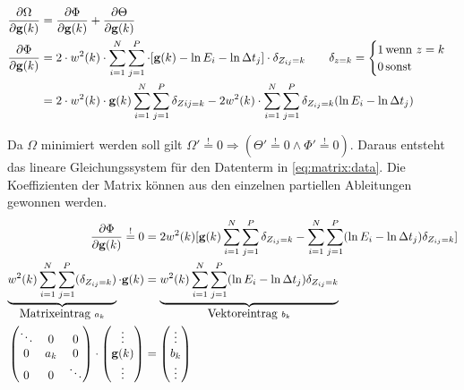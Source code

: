 \begin{align}
\label{eq:energy:partial}
\frac{\partial \Omega}{\partial \mathbf g(k)} & = \frac{\partial \Phi}{\partial \mathbf g(k)} +\frac{\partial \Theta}{\partial \mathbf g(k)}\\
\frac{\partial \Phi}{\partial \mathbf g(k)} &= 2\cdot w^2(k) \cdot \sum \limits_{i=1}^{N} \sum \limits_{j=1}^{P} \cdot[\mathbf g(k) - \ln E_i - \ln \Delta t_j]\cdot \delta_{Z_{ij}=k} \qquad \delta_{z=k} = \begin{cases}
    1 \, \mbox{wenn } z = k\\
    0 \, \mbox{sonst}
\end{cases}\\
&=2\cdot w^2(k) \cdot \mathbf g(k) \sum \limits_{i=1}^{N} \sum \limits_{j=1}^{P}\delta_{Z{ij}=k} - 2w^2(k)\cdot\sum \limits_{i=1}^{N} \sum \limits_{j=1}^{P}\delta_{Z_{ij}=k}(\ln E_i - \ln \Delta t_j)
\end{align}

Da $\Omega$ minimiert werden soll gilt $\Omega' \overset{!}{=} 0 \Rightarrow (\Theta' \overset{!}{=} 0 \wedge \Phi' \overset{!}{=} 0)$. Daraus entsteht das lineare Gleichungssystem für den Datenterm in \autoref{eq:matrix:data}. Die Koeffizienten der Matrix können aus den einzelnen partiellen Ableitungen gewonnen werden.
\begin{align}
\frac{\partial \Phi}{\partial \mathbf g(k)} 
    \overset{!}{=} 0 & = 
    2 w^2(k) [\mathbf g(k) \sum_{i=1}^{N} \sum_{j=1}^{P}\delta_{Z_{ij}=k} - 
    \sum_{i=1}^{N} \sum_{j=1}^{P}(\ln E_i - \ln \Delta t_j)\delta_{Z_{ij}=k}]\\
    \underbrace{
        w^2(k) \sum_{i=1}^{N} \sum_{j=1}^{P}(\delta_{Z_{ij}=k})
    }_{\mbox{Matrixeintrag }a_k} 
    \cdot \mathbf g(k) &= 
    \underbrace{
        w^2(k) \sum_{i=1}^{N} \sum_{j=1}^{P}(\ln E_i - \ln \Delta t_j)\delta_{Z_{ij}=k}
    }_{\mbox{Vektoreintrag }b_k} \\ 
\begin{pmatrix}
\ddots & 0& 0\\
0 & a_k & 0\\
0 & 0 & \ddots
\end{pmatrix}
 \cdot \begin{pmatrix}
 \vdots\\
 \mathbf g(k)\\
 \vdots
 \end{pmatrix} &= \label{eq:matrix:data}
\begin{pmatrix}
 \vdots\\
 b_k\\
 \vdots
 \end{pmatrix} 
\end{align}


